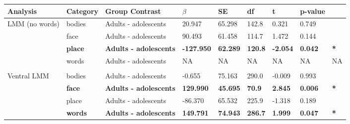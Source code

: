 
\begin{longtable}{lllllllll}
\toprule
Analysis & Category & Group Contrast & $\beta$ & SE & df & t & p-value & \\
\midrule
LMM (no words) & bodies & Adults - adolescents & 20.947 & 65.298 & 142.8 & 0.321 & 0.749 & \\
 & face & Adults - adolescents & 90.493 & 61.458 & 114.7 & 1.472 & 0.144 & \\
\textbf{} & \textbf{place} & \textbf{Adults - adolescents} & \textbf{-127.950} & \textbf{62.289} & \textbf{120.8} & \textbf{-2.054} & \textbf{0.042} & \textbf{*}\\
 & words & Adults - adolescents & NA & NA & NA & NA & NA & NA\\
 &  &  &  &  &  &  &  & \\
\addlinespace
Ventral LMM & bodies & Adults - adolescents & -0.655 & 75.163 & 290.0 & -0.009 & 0.993 & \\
\textbf{} & \textbf{face} & \textbf{Adults - adolescents} & \textbf{129.990} & \textbf{45.695} & \textbf{70.9} & \textbf{2.845} & \textbf{0.006} & \textbf{*}\\
 & place & Adults - adolescents & -86.370 & 65.532 & 225.9 & -1.318 & 0.189 & \\
\textbf{} & \textbf{words} & \textbf{Adults - adolescents} & \textbf{149.791} & \textbf{74.943} & \textbf{286.7} & \textbf{1.999} & \textbf{0.047} & \textbf{*}\\
\bottomrule
\end{longtable}
